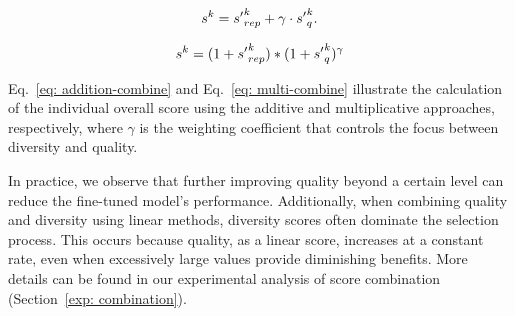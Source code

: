 \begin{equation}
\small
\label{eq: addition-combine}
    s^{k} = {s'}^{k}_{rep} + \gamma \cdot {s'}_{q}^{k}.
\end{equation}


\begin{equation}
\small
\label{eq: multi-combine}
s^{k} =  (1+{s'}_{rep}^{k}) * (1+{s'}_{q}^{k})^{\gamma}
\end{equation}

Eq.~\ref{eq: addition-combine} and Eq.~\ref{eq: multi-combine} illustrate the calculation of the individual overall score using the additive and multiplicative approaches, respectively, where $\gamma$ is the weighting coefficient that controls the focus between diversity and quality. 


In practice, we observe that further improving quality beyond a certain level can reduce the fine-tuned model's performance. Additionally, when combining quality and diversity using linear methods, diversity scores often dominate the selection process. This occurs because quality, as a linear score, increases at a constant rate, even when excessively large values provide diminishing benefits. More details can be found in our experimental analysis of score combination (Section~\ref{exp: combination}). 

